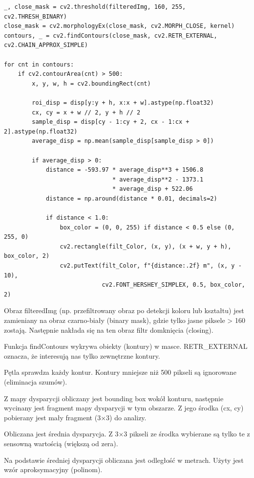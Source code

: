 \documentclass[magisterska]{pracadypl}
\begin{document}
\begin{lstlisting}[style=mypython]
_, close_mask = cv2.threshold(filteredImg, 160, 255, cv2.THRESH_BINARY)
close_mask = cv2.morphologyEx(close_mask, cv2.MORPH_CLOSE, kernel)
contours, _ = cv2.findContours(close_mask, cv2.RETR_EXTERNAL, cv2.CHAIN_APPROX_SIMPLE)

for cnt in contours:
    if cv2.contourArea(cnt) > 500:
        x, y, w, h = cv2.boundingRect(cnt)

        roi_disp = disp[y:y + h, x:x + w].astype(np.float32)
        cx, cy = x + w // 2, y + h // 2
        sample_disp = disp[cy - 1:cy + 2, cx - 1:cx + 2].astype(np.float32)
        average_disp = np.mean(sample_disp[sample_disp > 0])

        if average_disp > 0:
            distance = -593.97 * average_disp**3 + 1506.8 
                               * average_disp**2 - 1373.1 
                               * average_disp + 522.06
            distance = np.around(distance * 0.01, decimals=2)

            if distance < 1.0:
                box_color = (0, 0, 255) if distance < 0.5 else (0, 255, 0)
                cv2.rectangle(filt_Color, (x, y), (x + w, y + h), box_color, 2)
                cv2.putText(filt_Color, f"{distance:.2f} m", (x, y - 10),
                            cv2.FONT_HERSHEY_SIMPLEX, 0.5, box_color, 2)
\end{lstlisting}

Obraz filteredImg (np. przefiltrowany obraz po detekcji koloru lub kształtu) jest zamieniany na obraz czarno-biały (binary mask), gdzie tylko jasne piksele > 160 zostają. Następnie nakłada się na ten obraz filtr domknięcia (closing).

Funkcja findContours wykrywa obiekty (kontury) w masce. RETR\_EXTERNAL oznacza, że interesują nas tylko zewnętrzne kontury.

Pętla sprawdza każdy kontur. Kontury mniejsze niż 500 pikseli są ignorowane (eliminacja szumów).

Z mapy dysparycji obliczany jest bounding box wokół konturu, następnie wycinany jest fragment mapy dysparycji w tym obszarze. Z jego środka (cx, cy) pobierany jest mały fragment (3×3) do analizy.

Obliczana jest średnia dysparycja. Z 3×3 pikseli ze środka wybierane są tylko te z sensowną wartością (większą od zera).

Na podstawie średniej dysparycji obliczana jest odległość w metrach. Użyty jest wzór aproksymacyjny (polinom).
\end{document}
